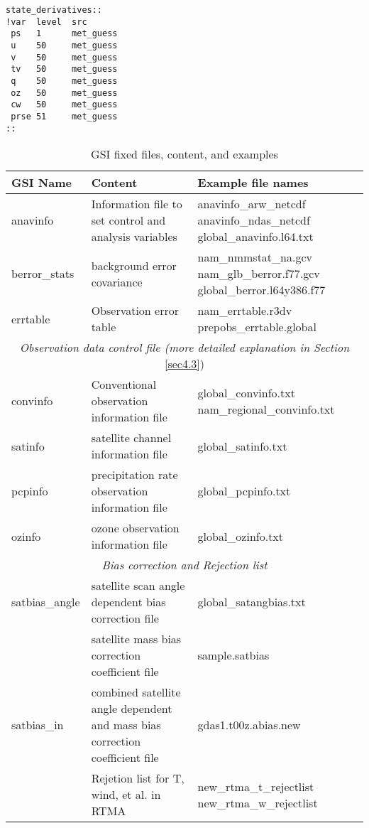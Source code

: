 \begin{small}
\begin{verbatim}
state_derivatives::
!var  level  src
 ps   1      met_guess
 u    50     met_guess
 v    50     met_guess
 tv   50     met_guess
 q    50     met_guess
 oz   50     met_guess
 cw   50     met_guess
 prse 51     met_guess
::
\end{verbatim}
\end{small}


\begin{table}[h!]
\centering
\begin{footnotesize}
\caption{GSI fixed files, content, and examples}
\begin{tabular}{|p{2.5cm}|p{5cm}|p{7cm}|}
\hline
\hline
GSI Name  & Content & Example file names \\
\hline
\hline
anavinfo & Information file to set control and analysis variables &	
anavinfo\_arw\_netcdf  \newline
anavinfo\_ndas\_netcdf    
global\_anavinfo.l64.txt  \\
\hline
berror\_stats &	background error covariance &	nam\_nmmstat\_na.gcv
nam\_glb\_berror.f77.gcv
global\_berror.l64y386.f77 \\
\hline
errtable & Observation error table & nam\_errtable.r3dv \newline
prepobs\_errtable.global \\
\hline
\multicolumn{3}{|c|}{\textit{Observation data control file (more detailed explanation in Section} \ref{sec4.3})} \\
\hline
convinfo & Conventional observation information file & global\_convinfo.txt
nam\_regional\_convinfo.txt \\
\hline
satinfo & satellite channel information file & 	global\_satinfo.txt \\
\hline
pcpinfo	& precipitation rate observation information file & global\_pcpinfo.txt \\
\hline
ozinfo & ozone observation information file	& global\_ozinfo.txt \\
\hline
\multicolumn{3}{|c|}{\textit{Bias correction and Rejection list}} \\
\hline 
satbias\_angle & satellite scan angle dependent bias correction file	& global\_satangbias.txt \\
\hline
\multirow{3}{2cm}{satbias\_in} & satellite mass bias correction coefficient file & sample.satbias \\ \cline{2-3} 
& combined satellite angle dependent and mass bias correction coefficient file &	gdas1.t00z.abias.new \\
\hline
t\_rejectlist, w\_rejectlist,.. & Rejetion list for T, wind, et al. in RTMA	& new\_rtma\_t\_rejectlist
new\_rtma\_w\_rejectlist \\
\hline
\end{tabular}
\label{t32}
\end{footnotesize}
\end{table} 



